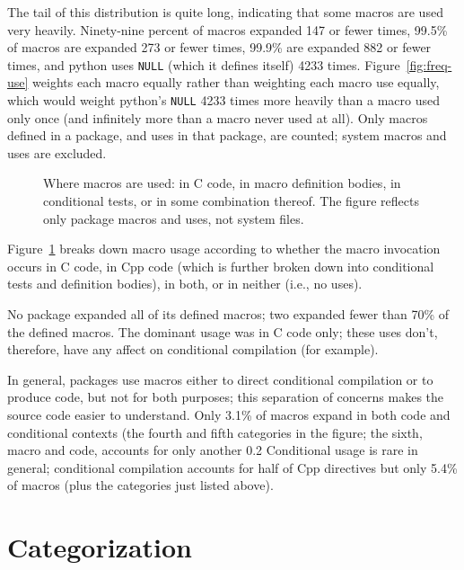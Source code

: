 \documentclass[11pt]{article}
\begin{document}
The tail of this distribution is quite long, indicating that some macros
are used very heavily.  Ninety-nine percent of macros expanded 147 or fewer
times, 99.5\% of macros are expanded 273 or fewer times, 99.9\% are
expanded 882 or fewer times, and python uses {\tt NULL} (which it defines
itself) 4233 times.  Figure~\ref{fig:freq-use} weights each macro equally
rather than weighting each macro use equally, which would weight python's
{\tt NULL} 4233 times more heavily than a macro used only once (and
infinitely more than a macro never used at all).  Only macros defined in a
package, and uses in that package, are counted; system macros and uses are
excluded.


\begin{figure}
\centerline{}
\caption{Where macros are used: in C code, in macro definition bodies, in
  conditional tests, or in some combination thereof.  The figure reflects
  only package macros and uses, not system files.}
\label{fig:where-used}
\end{figure}

Figure~\ref{fig:where-used} breaks down macro usage according to whether
the macro invocation occurs in C code, in Cpp code (which is further broken
down into conditional tests and definition bodies), in both, or in neither
(i.e., no uses).  

No package expanded all of its defined macros; two expanded fewer than 70\%
of the defined macros.  The dominant usage was in C code only; these uses
don't, therefore, have any affect on conditional compilation (for example).

In general, packages use macros either to direct conditional compilation or
to produce code, but not for both purposes; this separation of concerns
makes the source code easier to understand.  Only 3.1\% of macros expand in
both code and conditional contexts (the fourth and fifth categories in the
figure; the sixth, macro and code, accounts for only another 0.2%
Conditional usage is rare in general; conditional compilation accounts for
half of Cpp directives but only 5.4\% of macros (plus the categories just
listed above).



\section{Categorization}
\label{sec:categorization}
\end{document}
